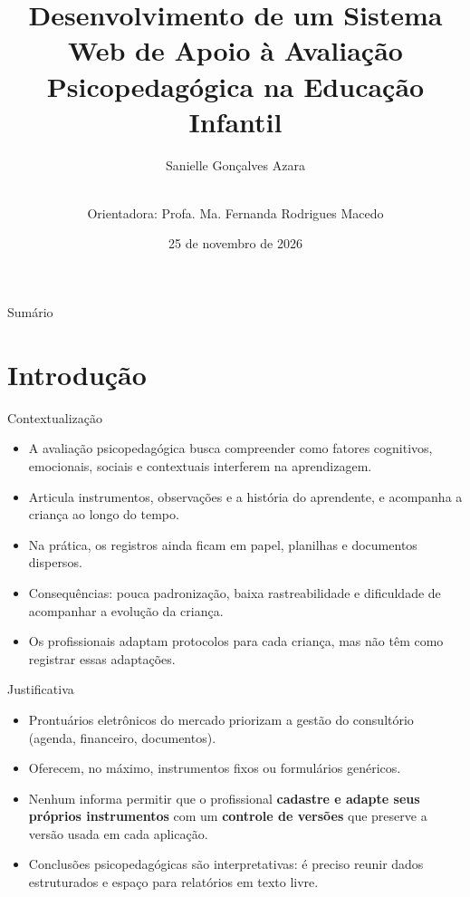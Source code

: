 \documentclass[compress]{beamer}
\title{Desenvolvimento de um Sistema Web de Apoio à Avaliação Psicopedagógica na Educação Infantil}
\institute{Curso de Engenharia da Computação - UEMG - Unidade Divinópolis}
\author{Sanielle Gonçalves Azara \and \\
Orientadora: Profa. Ma. Fernanda Rodrigues Macedo}
\date{25 de novembro de 2026}
\begin{document}

\maketitle

\begin{frame}{Sumário}
    \tableofcontents
\end{frame}

\section{Introdução}

\begin{frame}{Contextualização}
\begin{itemize}
    \item A avaliação psicopedagógica busca compreender como fatores cognitivos, emocionais, sociais e contextuais interferem na aprendizagem.
    \item Articula instrumentos, observações e a história do aprendente, e acompanha a criança ao longo do tempo.
    \item Na prática, os registros ainda ficam em papel, planilhas e documentos dispersos.
    \item Consequências: pouca padronização, baixa rastreabilidade e dificuldade de acompanhar a evolução da criança.
    \item Os profissionais adaptam protocolos para cada criança, mas não têm como registrar essas adaptações.
\end{itemize}
\end{frame}

\begin{frame}{Justificativa}
\begin{itemize}
    \item Prontuários eletrônicos do mercado priorizam a gestão do consultório (agenda, financeiro, documentos).
    \item Oferecem, no máximo, instrumentos fixos ou formulários genéricos.
    \item Nenhum informa permitir que o profissional \textbf{cadastre e adapte seus próprios instrumentos} com um \textbf{controle de versões} que preserve a versão usada em cada aplicação.
    \item Conclusões psicopedagógicas são interpretativas: é preciso reunir dados estruturados e espaço para relatórios em texto livre.
\end{itemize}
\end{frame}
\end{document}
